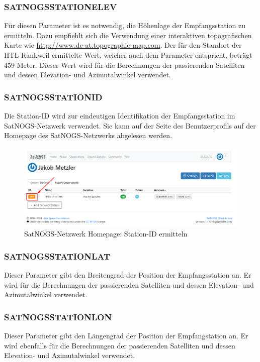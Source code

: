 \subsubsection{SATNOGS\textunderscore STATION\textunderscore ELEV}
Für diesen Parameter ist es notwendig, die Höhenlage der Empfangsstation zu ermitteln. Dazu empfiehlt sich die Verwendung einer interaktiven topografischen Karte wie \url{http://www.de-at.topographic-map.com}. Der für den Standort der HTL Rankweil ermittelte Wert, welcher auch dem Parameter entspricht, beträgt 459 Meter. Dieser Wert wird für die Berechnungen der passierenden Satelliten und dessen Elevation- und Azimutalwinkel verwendet.

\subsubsection{SATNOGS\textunderscore STATION\textunderscore ID}
Die Station-ID wird zur eindeutigen Identifikation der Empfangsstation im SatNOGS-Netzwerk verwendet. Sie kann auf der Seite des Benutzerprofils auf der Homepage des SatNOGS-Netzwerks abgelesen werden. 

\begin{figure} [H]
	\centering
	\includegraphics[width=.75\linewidth]{../ref/stationid.png}
	\caption{SatNOGS-Netzwerk Homepage: Station-ID ermitteln \cite{noauthor_satnogsdashboard_nodate}}
	\label{fig:stationid}
\end{figure}

\subsubsection{SATNOGS\textunderscore STATION\textunderscore LAT}
Dieser Parameter gibt den Breitengrad der Position der Empfangsstation an. Er wird für die Berechnungen der passierenden Satelliten und dessen Elevation- und Azimutalwinkel verwendet.

\subsubsection{SATNOGS\textunderscore STATION\textunderscore LON}
Dieser Parameter gibt den Längengrad der Position der Empfangstation an. Er wird ebenfalls für die Berechnungen der passierenden Satelliten und dessen Elevation- und Azimutalwinkel verwendet.

